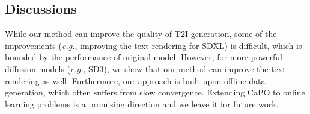 



% 

% 

% 

% 


% 
\subsection{Discussions}
While our method can improve the quality of T2I generation, some of the improvements (\emph{e.g.}, improving the text rendering for SDXL) is difficult, which is bounded by the performance of original model.
However, for more powerful diffusion models (\emph{e.g.}, SD3), we show that our method can improve the text rendering as well. 
Furthermore, our approach is built upon offline data generation, which often suffers from slow convergence. Extending CaPO to online learning problems is a promising direction and we leave it for future work.